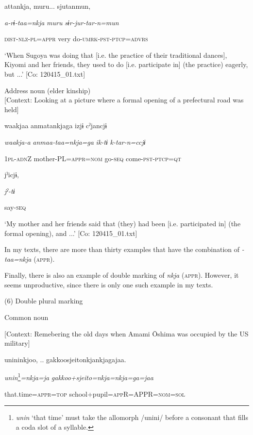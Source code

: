       attankja,  muru...  sjutanmun,

      \textit{a-rɨ-taa=nkja}  \textit{muru}  \textit{sɨr-jur-tar-n=mun}

      \textsc{dist}-\textsc{nlz}-\textsc{pl}=\textsc{appr}  very  do-\textsc{umrk}-\textsc{pst}-\textsc{ptcp}=\textsc{advrs}

\glt ‘When Sugoya was doing that [i.e. the practice of their traditional dances], Kiyomi and her friends, they used to do [i.e. participate in] (the practice) eagerly, but ...’ [Co: 120415\_01.txt]
\z

 \ex Address noun (elder kinship)\\{}
[Context: Looking at a picture where a formal opening of a prefectural road was held]

{\TM}
\gll waakjaa  anmatankjaga  izjɨ  cˀjancjɨ

      \textit{waakja-a}  \textit{anmaa-taa=nkja=ga}  \textit{ik-tɨ}  \textit{k-tar-n=ccjɨ}

      1\textsc{pl}-\textsc{adn}Z  mother-PL=\textsc{appr}=\textsc{nom}  go-\textsc{seq}  come-\textsc{pst}-\textsc{ptcp}=\textsc{qt}

      jˀicjɨ,

      \textit{jˀ-tɨ}

      say-\textsc{seq}

\glt ‘My mother and her friends said that (they) had been [i.e. participated in] (the formal opening), and ...’ [Co: 120415\_01.txt]
\z

In my texts, there are more than thirty examples that have the combination of \textit{{}-taa=nkja} (\textsc{appr}).

Finally, there is also an example of double marking of \textit{nkja} (\textsc{appr}). However, it seems unproductive, since there is only one such example in my texts.

(6)  Double plural marking

  Common noun

  [Context: Remebering the old days when Amami Ōshima was occupied by the US military]

{\TM}
\gll unininkjoo, ..\textsubscript{} {\textbar}gakkoosjeito{\textbar}nkjankjagajaa.

    \textit{unin}\footnote{\textit{unin} ‘that time’ must take the allomorph /unini/ before a consonant that fills a coda slot of a syllable.}\textit{=nkja=ja}  \textit{gakkoo+sjeito=nkja=nkja=ga=jaa}

    that.time=\textsc{appr}=\textsc{top}  school+pupil=\textsc{app}R=APPR=\textsc{nom}=\textsc{sol}

